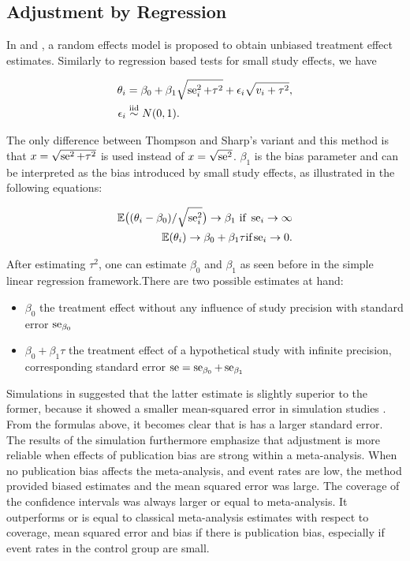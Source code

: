 \documentclass[11pt,a4paper,twoside]{book}\usepackage[]{graphicx}\usepackage[]{color}
\begin{document}
\subsection{Adjustment by Regression} \label{sec:regression.adjustment}
In \citet{limitmeta.2} and \citet{limitmeta}, a random effects model is proposed to obtain unbiased treatment effect estimates. Similarly to regression based tests for small study effects, we have

\begin{align}
\theta_i & = \beta_0 + \beta_1\sqrt{\se_i^2 + \tau^2} + \epsilon_i\sqrt{v_i + \tau^2}, \label{eq:limitmeta.regression} \\
\epsilon_i &\stackrel{\textrm{iid}}{\sim} N(0,1).
\end{align}

The only difference between Thompson and Sharp's variant and this method is that $x = \sqrt{\operatorname{se}^2 + \tau^2}$ is used instead of $x = \sqrt{\operatorname{se}^2}$. $\beta_{1}$ is the bias parameter and can be interpreted as the bias introduced by small study effects, as illustrated in the following equations:

\begin{align}
\mathbb{E}\big((\theta_i - \beta_0)/\sqrt{\se_i^2}\big) \rightarrow \beta_1 \textrm{ if } \se_i \rightarrow \infty \nonumber \\ %
\mathbb{E}(\theta_i) \rightarrow \beta_0 + \beta_1 \tau \textrm{if} \se_i \rightarrow 0. \nonumber
\end{align}

After estimating $\tau^2$, one can estimate $\beta_{0}$ and $\beta_{1}$ as seen before in the simple linear regression framework.There are two possible estimates at hand:
\begin{itemize}
\item $\beta_0$ the treatment effect without any influence of study precision with standard error $\operatorname{se}_{\beta_0}$
\item $\beta_0 + \beta_1 \tau$ the treatment effect of a hypothetical study with infinite precision, corresponding standard error $\operatorname{se} = \operatorname{se}_{\beta_0} + \operatorname{se}_{\beta_1}$
\end{itemize}

Simulations in \citet{limitmeta} suggested that the latter estimate is slightly superior to the former, because it showed a smaller mean-squared error in simulation studies \citet{limitmeta.2}. From the formulas above, it becomes clear that is has a larger standard error. The results of the simulation furthermore emphasize that adjustment is more reliable when effects of publication bias are strong within a meta-analysis. When no publication bias affects the meta-analysis, and event rates are low, the method provided biased estimates and the mean squared error was large. The coverage of the confidence intervals was always larger or equal to meta-analysis. It outperforms or is equal to classical meta-analysis estimates with respect to coverage, mean squared error and bias if there is publication bias, especially if event rates in the control group are small. 
\end{document}
